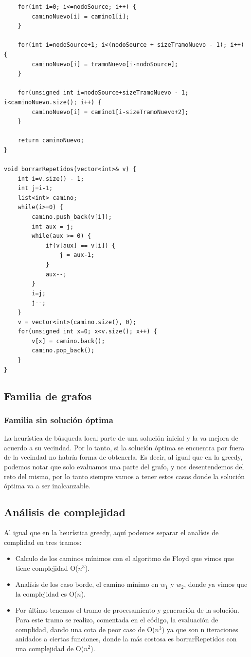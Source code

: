 \begin{lstlisting}
	for(int i=0; i<=nodoSource; i++) {
		caminoNuevo[i] = camino1[i];
	}

	for(int i=nodoSource+1; i<(nodoSource + sizeTramoNuevo - 1); i++) {
		caminoNuevo[i] = tramoNuevo[i-nodoSource];
	}

	for(unsigned int i=nodoSource+sizeTramoNuevo - 1; i<caminoNuevo.size(); i++) {
		caminoNuevo[i] = camino1[i-sizeTramoNuevo+2];
	}
	
	return caminoNuevo;
}

void borrarRepetidos(vector<int>& v) {
    int i=v.size() - 1;
    int j=i-1;
    list<int> camino;
    while(i>=0) {
        camino.push_back(v[i]);
        int aux = j;
        while(aux >= 0) {
            if(v[aux] == v[i]) {
            	j = aux-1;
            }
            aux--;
        }
        i=j;
        j--;
    }
    v = vector<int>(camino.size(), 0);
    for(unsigned int x=0; x<v.size(); x++) {
        v[x] = camino.back();
        camino.pop_back();
    }
}

\end{lstlisting}

\newpage
\subsection{Familia de grafos}
\subsubsection{Familia sin soluci\'on \'optima}
La heur\'istica de b\'usqueda local parte de una soluci\'on inicial y la va mejora de acuerdo a su vecindad. Por lo tanto, si la soluci\'on \'optima se encuentra por fuera de la vecindad no habr\'ia forma de obtenerla. Es decir, al igual que en la greedy, podemos notar que solo evaluamos una parte del grafo, y nos desentendemos del reto del mismo, por lo tanto siempre vamos a tener estos casos donde la soluci\'on \'optima va a ser inalcanzable.


\newpage
\subsection{An\'alisis de complejidad}

Al igual que en la heur\'istica greedy, aqu\'i podemos separar el anal\'isis de complidad en tres tramos:
\begin{itemize}
\item Calculo de los caminos m\'inimos con el algoritmo de Floyd que vimos que tiene complejidad O($n^3$).
\item Anal\'isis de los caso borde, el camino m\'inimo en $w_1$ y $w_2$, donde ya vimos que la complejidad es O($n$).
\item Por \'ultimo tenemos el tramo de procesamiento y generaci\'on de la soluci\'on.
Para este tramo se realizo, comentada en el c\'odigo, la evaluaci\'on de complidad, dando una cota de peor caso de 
O($n^3$) ya que son n iteraciones anidados a ciertas funciones, donde la m\'as costosa es borrarRepetidos con una 
complejidad de O($n^2$).
\end{itemize}

